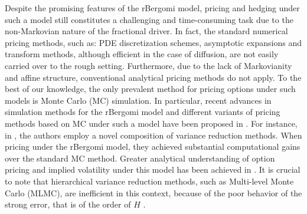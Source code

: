 Despite the promising features of the rBergomi model, pricing  and hedging under such a model still constitutes a challenging and time-consuming task due  to the non-Markovian nature of the fractional driver.  In fact, the standard numerical pricing methods, such as: PDE discretization schemes, asymptotic expansions and transform
methods, although efficient in the case of diffusion, are not easily  carried over to the rough setting. Furthermore,  due to the lack of Markovianity and affine structure, conventional analytical pricing methods  do not apply. To the best of our knowledge, the only prevalent method for pricing  options under such models is Monte Carlo (MC) simulation. In particular,  recent advances in simulation methods for the rBergomi model and different variants of pricing methods based on  MC under such a model   have been proposed in \cite{bayer2016pricing,bayer2017regularity,bennedsen2017hybrid,mccrickerd2018turbocharging,jacquier2018vix}.  For instance, in \cite{mccrickerd2018turbocharging}, the authors employ a novel composition of variance reduction methods. When pricing under the rBergomi model, they achieved substantial computational gains  over the standard MC method.  Greater  analytical understanding of option pricing and implied volatility under this model has been achieved  in \cite{jacquier2017pathwise,forde2017asymptotics,bayer2018short}.  It is crucial to note that hierarchical variance reduction methods, such
as Multi-level Monte Carlo (MLMC), are inefficient in this context, because of the poor behavior of the strong error, that is of the order of $H$ \cite{neuenkirch2016order}.


